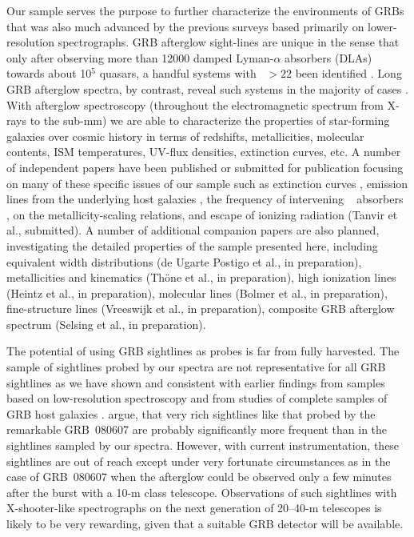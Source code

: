 \documentclass{aa}    %
\begin{document}
Our sample serves the purpose to further characterize the environments of GRBs
that was also much advanced by the previous surveys based primarily on
lower-resolution spectrographs. GRB afterglow sight-lines are unique in the
sense that only after observing more than 12000 damped Lyman-$\alpha$ absorbers
(DLAs) towards about 10$^5$ quasars, a handful systems with \nh~$ > 22$ been
identified \citep[e.g., five in][]{Noterdaeme2012b}. Long GRB afterglow spectra,
by contrast, reveal such systems in the majority of cases \citep[][and this
work]{Jakobsson2006b, Fynbo2009, Cucchiara2015}. With afterglow spectroscopy
(throughout the electromagnetic spectrum from X-rays to the sub-mm) we are able
to characterize the properties of star-forming galaxies over cosmic history in
terms of redshifts, metallicities, molecular contents, ISM temperatures, UV-flux
densities, extinction curves, etc.  A number of independent papers have been
published or submitted for publication focusing on many of these specific issues
of our sample such as extinction curves \citep[][see also \citealt{Fynbo2014,
	Heintz2017}]{Japelj2015, Zafar17}, emission lines from the underlying host
galaxies \citep{Kruhler2015}, the frequency of intervening \mgii~ absorbers
\citep{Christensen2017}, \citet{Arabsalmani2018} on the metallicity-scaling
relations, and escape of ionizing radiation (Tanvir et al., submitted). A number
of additional companion papers are also planned, investigating the detailed
properties of the sample presented here, including equivalent width
distributions (de Ugarte Postigo et al., in preparation), metallicities and
kinematics (Th{\"o}ne et al., in preparation), high ionization lines (Heintz et
al., in preparation), molecular lines (Bolmer et al., in preparation),
fine-structure lines (Vreeswijk et al., in preparation), composite GRB afterglow
spectrum (Selsing et al., in preparation).

The potential of using GRB sightlines as probes is far from fully harvested. The
sample of sightlines probed by our spectra are not representative for all GRB
sightlines as we have shown and consistent with earlier findings from samples
based on low-resolution spectroscopy \citep[e.g.,][]{Fynbo2009} and from studies
of complete samples of GRB host galaxies \citep{Hjorth2012, Covino2013,
	Perley2016}. \cite{Kruhler2013} argue, that very rich sightlines like that
probed by the remarkable GRB~080607 \citep{Prochaska2009} are probably
significantly more frequent than in the sightlines sampled by our spectra.
However, with current instrumentation, these sightlines are out of reach except
under very fortunate circumstances as in the case of GRB~080607 when the
afterglow could be observed only a few minutes after the burst with a 10-m class
telescope. Observations of such sightlines with X-shooter-like spectrographs on
the next generation of 20--40-m telescopes is likely to be very rewarding, given
that a suitable GRB detector will be available.
\end{document}
